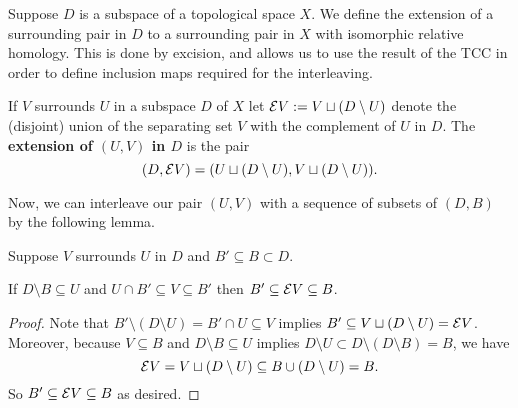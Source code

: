 

Suppose $D$ is a subspace of a topological space $X$.
We define the extension of a surrounding pair in $D$ to a surrounding pair in $X$ with isomorphic relative homology.
This is done by excision, and allows us to use the result of the TCC in order to define inclusion maps required for the interleaving.

\begin{definition}[Extension]
  If $V$ surrounds $U$ in a subspace $D$ of $X$ let $\mathcal{E} V := V\sqcup (D\setminus U)$ denote the (disjoint) union of the separating set $V$ with the complement of $U$ in $D$.
  The \textbf{extension of $(U, V)$ in $D$} is the pair
  \[ (D, \mathcal{E} V) = (U\sqcup (D\setminus U), V\sqcup (D\setminus U)).\]
\end{definition}

Now, we can interleave our pair $(U, V)$ with a sequence of subsets of $(D, B)$ by the following lemma.

\begin{lemma}\label{lem:surround_and_cover}
  Suppose $V$ surrounds $U$ in $D$ and $B'\subseteq B\subset D$.

  If $D\setminus B\subseteq U$ and $U\cap B'\subseteq V\subseteq B'$ then $B'\subseteq \mathcal{E} V\subseteq B$.
\end{lemma}
\begin{proof}
  Note that $B'\setminus (D\setminus U) = B'\cap U\subseteq V$ implies $B'\subseteq V\sqcup(D\setminus U) = \mathcal{E} V$.
  Moreover, because $V\subseteq B$ and $D\setminus B\subseteq U$ implies $D\setminus U \subset D\setminus (D\setminus B) = B$, we have
  \[ \mathcal{E} V = V\sqcup (D\setminus U) \subseteq B\cup (D\setminus U) = B. \]
  So $B' \subseteq \mathcal{E} V\subseteq B$ as desired.
\end{proof}

